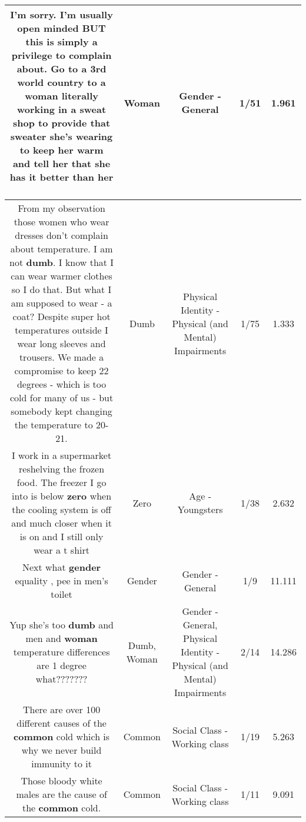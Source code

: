 \documentclass[11pt]{article}
\newlength\mylength
\begin{document}
\begin{center}
\begin{longtable}{|C{.65\mylength}|C{.30\mylength}|C{.12\mylength}|C{.12\mylength}|C{.12\mylength}|}
  \small I'm sorry. I'm usually open minded BUT this is simply a privilege to complain about. Go to a 3rd world country to a \textbf{woman} literally working in a sweat shop to provide that sweater she's wearing to keep her warm and tell her that she has it better than her 🤦🏽‍♂️🤦🏽‍♂️🤦🏽‍♂️🤦🏽‍♂️\normalsize   & Woman & Gender - General & 1/51 & 1.961 \\  \hline
  \small From my observation those women who wear dresses don't complain about temperature. I am not \textbf{dumb}. I know that I can wear warmer clothes so I do that. But what I am supposed to wear - a coat? Despite super hot temperatures outside I wear long sleeves and trousers. We made a compromise to keep 22 degrees - which is too cold for many of us - but somebody kept changing the temperature to 20-21.\normalsize   & Dumb & Physical Identity - Physical (and Mental) Impairments & 1/75 & 1.333 \\  \hline
  \small I work in a supermarket reshelving the frozen food. The freezer I go into is below \textbf{zero} when the cooling system is off and much closer when it is on and I still only wear a t shirt\normalsize   & Zero & Age - Youngsters & 1/38 & 2.632 \\  \hline
  \small Next what \textbf{gender} equality , pee in men's toilet\normalsize   & Gender & Gender - General & 1/9 & 11.111 \\  \hline
  \small Yup she's too \textbf{dumb} and men and \textbf{woman} temperature differences are 1 degree what???????\normalsize   & Dumb, Woman & Gender - General, Physical Identity - Physical (and Mental) Impairments & 2/14 & 14.286 \\  \hline
  \small There are over 100 different causes of the \textbf{common} cold which is why we never build immunity to it\normalsize   & Common & Social Class - Working class & 1/19 & 5.263 \\  \hline
  \small Those bloody white males are the cause of the \textbf{common} cold.\normalsize   & Common & Social Class - Working class & 1/11 & 9.091 \\  \hline

\end{longtable}
\end{center}
\end{document}
